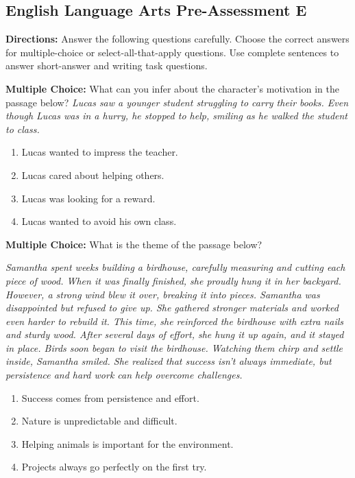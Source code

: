 \documentclass[12pt]{article}
\begin{document}
\subsection*{English Language Arts Pre-Assessment E}
\onehalfspacing

\begin{tcolorbox}[colframe=black!50, colback=white, title=Assessment Directions]
\textbf{Directions:} Answer the following questions carefully. Choose the correct answers for multiple-choice or select-all-that-apply questions. Use complete sentences to answer short-answer and writing task questions.
\end{tcolorbox}

\begin{tcolorbox}[colframe=black!50, colback=white, title=Question 1]
\textbf{Multiple Choice:} What can you infer about the character’s motivation in the passage below?  
\textit{Lucas saw a younger student struggling to carry their books. Even though Lucas was in a hurry, he stopped to help, smiling as he walked the student to class.}  
\begin{enumerate}[label=(\Alph*)]
\item Lucas wanted to impress the teacher.  
\item Lucas cared about helping others.  
\item Lucas was looking for a reward.  
\item Lucas wanted to avoid his own class.  
\end{enumerate}
\end{tcolorbox}

\begin{tcolorbox}[colframe=black!50, colback=white, title=Question 2]
\textbf{Multiple Choice:} What is the theme of the passage below?  

\textit{Samantha spent weeks building a birdhouse, carefully measuring and cutting each piece of wood. When it was finally finished, she proudly hung it in her backyard. However, a strong wind blew it over, breaking it into pieces. Samantha was disappointed but refused to give up. She gathered stronger materials and worked even harder to rebuild it. This time, she reinforced the birdhouse with extra nails and sturdy wood. After several days of effort, she hung it up again, and it stayed in place. Birds soon began to visit the birdhouse. Watching them chirp and settle inside, Samantha smiled. She realized that success isn’t always immediate, but persistence and hard work can help overcome challenges.}

\begin{enumerate}[label=(\Alph*)]
\item Success comes from persistence and effort.  
\item Nature is unpredictable and difficult.  
\item Helping animals is important for the environment.  
\item Projects always go perfectly on the first try.  
\end{enumerate}
\end{tcolorbox}
\end{document}
